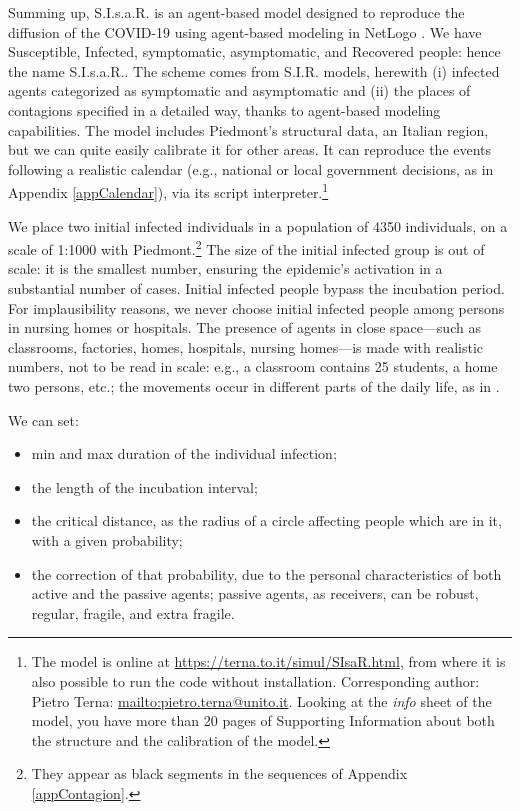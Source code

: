 \documentclass[graybox]{svmult}
\begin{document}
Summing up, S.I.s.a.R. \cite{SIsaR} is an agent-based model designed to reproduce the diffusion of the COVID-19 using agent-based modeling in NetLogo \cite{NetLogo}. We have Susceptible, Infected, symptomatic, asymptomatic, and Recovered people: hence the name S.I.s.a.R.. The scheme comes from S.I.R. models, herewith (i) infected agents categorized as symptomatic and asymptomatic and (ii) the places of contagions specified in a detailed way, thanks to agent-based modeling capabilities. The model includes Piedmont's structural data, an Italian region, but we can quite easily calibrate it for other areas. It can reproduce the events following a realistic calendar (e.g., national or local government decisions, as in Appendix \ref{appCalendar}), via its script interpreter.\footnote{\label{modOnLine}The model is online at \url{https://terna.to.it/simul/SIsaR.html}, from where it is also possible to run the code without installation. Corresponding author: Pietro Terna: \url{mailto:pietro.terna@unito.it}. Looking at the \emph{info} sheet of the model, you have more than 20 pages of Supporting Information about both the structure and the calibration of the model.}

We place two initial infected individuals in a population of 4350 individuals, on a scale of 1:1000 with Piedmont.\footnote{They appear as black segments in the sequences of Appendix \ref{appContagion}.} The size of the initial infected group is out of scale: it is the smallest number, ensuring the epidemic's activation in a substantial number of cases. Initial infected people bypass the incubation period. For implausibility reasons, we never choose initial infected people among persons in nursing homes or hospitals. The presence of agents in close space---such as classrooms, factories, homes, hospitals, nursing homes---is made with realistic numbers, not to be read in scale: e.g., a classroom contains 25 students, a home two persons, etc.; the movements occur in different parts of the daily life, as in \cite{ghorbani2020assocc}.

We can set: 
\begin{itemize}
\setlength\itemsep{0.3em}
\item min and max duration of the individual infection;

\item the length of the incubation interval;

\item the critical distance, as the radius of a circle affecting people which are in it, with a given probability;

\item the correction of that probability, due to the personal characteristics of both active and the passive agents; passive agents, as receivers, can be robust, regular, fragile, and extra fragile.

\end{itemize} 
\end{document}
